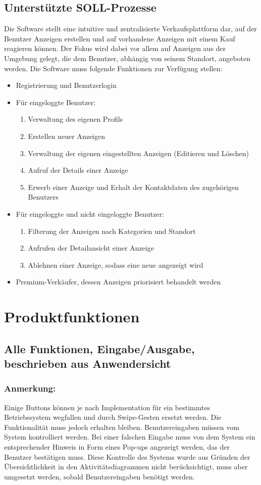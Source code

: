 \documentclass[a4paper,12pt,oneside]{scrartcl}
\begin{document}
\subsection{Unterstützte SOLL-Prozesse}
Die Software stellt eine intuitive und zentralisierte Verkaufsplattform dar, auf der Benutzer Anzeigen erstellen und auf vorhandene Anzeigen mit einem Kauf reagieren können.
Der Fokus wird dabei vor allem auf Anzeigen aus der Umgebung gelegt, die dem Benutzer, abhängig von seinem Standort, angeboten werden.
Die Software muss folgende Funktionen zur Verfügung stellen:
\begin{itemize}
	\item Registrierung und Benutzerlogin
	\item Für eingeloggte Benutzer:
	\begin{enumerate}
		\item Verwaltung des eigenen Profils
		\item Erstellen neuer Anzeigen
		\item Verwaltung der eigenen eingestellten Anzeigen (Editieren und Löschen)
		\item Aufruf der Details einer Anzeige
		\item Erwerb einer Anzeige und Erhalt der Kontaktdaten des zugehörigen Benutzers
	\end{enumerate}
	\item Für eingeloggte und nicht eingeloggte Benutzer:
	\begin{enumerate}
		\item Filterung der Anzeigen nach Kategorien und Standort
		\item Aufrufen der Detailansicht einer Anzeige
		\item Ablehnen einer Anzeige, sodass eine neue angezeigt wird
	\end{enumerate}
	\item Premium-Verkäufer, dessen Anzeigen priorisiert behandelt werden
\end{itemize}




\section{Produktfunktionen}
\subsection{Alle Funktionen, Eingabe/Ausgabe, beschrieben aus Anwendersicht}

\subsubsection*{Anmerkung:}
Einige Buttons können je nach Implementation für ein bestimmtes Betriebssystem wegfallen und durch Swipe-Gesten ersetzt werden.
Die Funktionalität muss jedoch erhalten bleiben. 
Benutzereingaben müssen vom System kontrolliert werden.
Bei einer falschen Eingabe muss von dem System ein entsprechender Hinweis in Form eines Pop-ups angezeigt werden, das der Benutzer bestätigen muss.
Diese Kontrolle des Systems wurde aus Gründen der Übersichtlichkeit in den Aktivitätsdiagrammen nicht berücksichtigt, muss aber umgesetzt werden, sobald Benutzereingaben benötigt werden.
\end{document}

